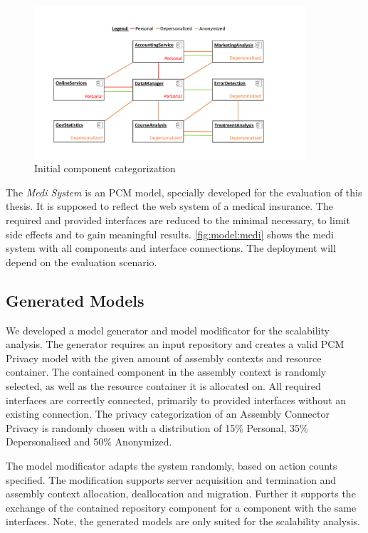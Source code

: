 \begin{figure}[h]
	\centering
	\includegraphics[trim = 0mm 10mm 0mm 20mm, clip, width=0.90\textwidth]{graphs/medSystem_noserver}
	\caption{Initial component categorization}
	\label{fig:model:medi}
\end{figure}

The \textit{Medi System} is an PCM model, specially developed for the evaluation of this thesis. It is supposed to reflect the web system of a medical insurance. The required and provided interfaces are reduced to the minimal necessary, to limit side effects and to gain meaningful results. \autoref{fig:model:medi} shows the medi system with all components and interface connections. The deployment will depend on the evaluation scenario.


\subsection{Generated Models}
\label{sec:Evaluation:models:generated}

We developed a model generator and model modificator for the scalability analysis. The generator requires an input repository and creates a valid PCM Privacy model with the given amount of assembly contexts and resource container. The contained component in the assembly context is randomly selected, as well as the resource container it is allocated on. All required interfaces are correctly connected, primarily to provided interfaces without an existing connection. The privacy categorization of an Assembly Connector Privacy is randomly chosen with a distribution of 15\% Personal, 35\% Depersonalised and 50\% Anonymized.

The model modificator adapts the system randomly, based on action counts specified. The modification supports server acquisition and termination and assembly context allocation, deallocation and migration. Further it supports the exchange of the contained repository component for a component with the same interfaces. Note, the generated models are only suited for the scalability analysis. 



